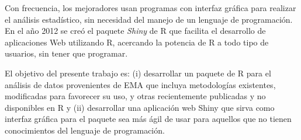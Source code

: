 Con frecuencia, los mejoradores usan programas con interfaz gráfica para realizar el análisis estadístico, sin necesidad del manejo de un lenguaje de programación. En el año 2012 se creó el paquete \emph{Shiny} de R que facilita el desarrollo de aplicaciones Web utilizando R, acercando la potencia de R a todo tipo de usuarios, sin tener que programar.

El objetivo del presente trabajo es: (i) desarrollar un paquete de R para el análisis de datos provenientes de EMA que incluya metodologías existentes, modificadas para favorecer su uso, y otras recientemente publicadas y no disponibles en R y (ii) desarrollar una aplicación web Shiny que sirva como interfaz gráfica para el paquete sea más ágil de usar para aquellos que no tienen conocimientos del lenguaje de programación.
